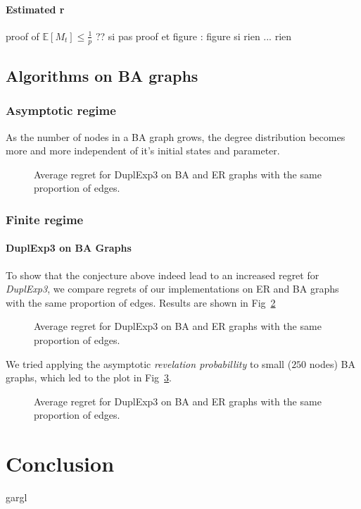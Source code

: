 \documentclass[10pt,a4paper]{scrartcl}
\providecommand{\E}{\mathbb{E}}
\begin{document}
\paragraph{Estimated r}
proof of $\E[M_t] \leq \frac{1}{p}$ ??
si pas proof et figure : figure
si rien ... rien


\subsection{Algorithms on BA graphs}
\subsubsection{Asymptotic regime}
As the number of nodes in a BA graph grows, the degree distribution becomes more and more independent of it's initial states and parameter. 
\begin{figure}
 \label{dupl_er_ba}
 \caption{Average regret for DuplExp3 on BA and ER graphs with the same proportion of edges.}
\end{figure}
\subsubsection{Finite regime}
\paragraph{DuplExp3 on BA Graphs}
To show that the conjecture above indeed lead to an increased regret for \emph{DuplExp3}, we compare regrets of our implementations on ER and BA graphs with the same proportion of edges. Results are shown in Fig~\ref{dupl_er_ba}

\begin{figure}
 \label{dupl_er_ba}
 \caption{Average regret for DuplExp3 on BA and ER graphs with the same proportion of edges.}
\end{figure}

We tried applying the asymptotic \emph{revelation probabillity} to small ($250$ nodes) BA graphs, which led to the plot in Fig~\ref{dupl_ba_finite_ba}.

\begin{figure}
 \label{dupl_ba_finite_ba}
 \caption{Average regret for DuplExp3 on BA and ER graphs with the same proportion of edges.}
\end{figure}


\section{Conclusion}
gargl
\end{document}
